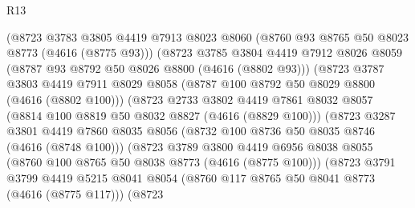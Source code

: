 \begin{lexlean}{R13}
\begin{coremodule}
                          (@8723
                            @3783
                            @3805
                            @4419
                            @7913
                            @8023
                            @8060
                            (@8760 @93 @8765 @50 @8023 @8773 (@4616 (@8775 @93)))
                            (@8723
                              @3785
                              @3804
                              @4419
                              @7912
                              @8026
                              @8059
                              (@8787 @93 @8792 @50 @8026 @8800 (@4616 (@8802 @93)))
                              (@8723
                                @3787
                                @3803
                                @4419
                                @7911
                                @8029
                                @8058
                                (@8787 @100 @8792 @50 @8029 @8800 (@4616 (@8802 @100)))
                                (@8723
                                  @2733
                                  @3802
                                  @4419
                                  @7861
                                  @8032
                                  @8057
                                  (@8814 @100 @8819 @50 @8032 @8827 (@4616 (@8829 @100)))
                                  (@8723
                                    @3287
                                    @3801
                                    @4419
                                    @7860
                                    @8035
                                    @8056
                                    (@8732 @100 @8736 @50 @8035 @8746 (@4616 (@8748 @100)))
                                    (@8723
                                      @3789
                                      @3800
                                      @4419
                                      @6956
                                      @8038
                                      @8055
                                      (@8760 @100 @8765 @50 @8038 @8773 (@4616 (@8775 @100)))
                                      (@8723
                                        @3791
                                        @3799
                                        @4419
                                        @5215
                                        @8041
                                        @8054
                                        (@8760 @117 @8765 @50 @8041 @8773 (@4616 (@8775 @117)))
                                        (@8723

\end{coremodule}
\end{lexlean}
